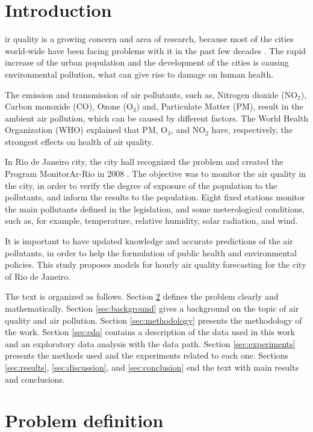 \section{Introduction}
\label{sec:introduction}

ir quality is a growing concern and area
of research, because most of the cities world-wide have been facing problems with it in
the past few decades \cite{mayer1999}. The rapid increase of the urban
population and the development of the cities is causing environmental
pollution, what can give rise to damage on human health. 

The emission and
transmission of air pollutants, such as, Nitrogen dioxide (NO$_2$), Carbon
monoxide (CO), Ozone (O$_3$)
and, Particulate Matter (PM), result in the ambient air pollution, which can be
caused by different factors. The World Health
Organization (WHO) explained \cite{who2006} that PM, O$_3$, and NO$_2$ have, respectively, the
strongest effects on health of air quality.

In Rio de Janeiro city, the city hall recognized the problem and created the
Program MonitorAr-Rio in 2008 \cite{relatorio2011}. The objective was to
monitor the air quality in the city, in order to verify the degree of exposure
of the population to the pollutants, and inform the results to the population.
Eight fixed stations monitor the main pollutants defined in the legislation,
and some meterological conditions, such as, for example, temperature, relative
humidity, solar radiation, and wind. 

It is important to have updated knowledge and accurate predictions of the
air pollutants, in order to help the formulation of public health and
environmental policies. This study proposes models for hourly air
quality forecasting for the city of Rio de Janeiro. 

The text is organized as follows. Section \ref{sec:problem-definition} defines
the problem clearly and mathematically. Section \ref{sec:background} gives a
background on the topic of air quality and air pollution. Section \ref{sec:methodology} presents
the methodology of the work. Section \ref{sec:eda} contains a description of the data used in this
work and an exploratory data analysis with the
data path. Section \ref{sec:experiments} presents the
methods used and the experiments related to each one. Sections
\ref{sec:results}, \ref{sec:discussion}, and \ref{sec:conclusion} end the text
with main results and conclusions. 


\section{Problem definition}
\label{sec:problem-definition}

